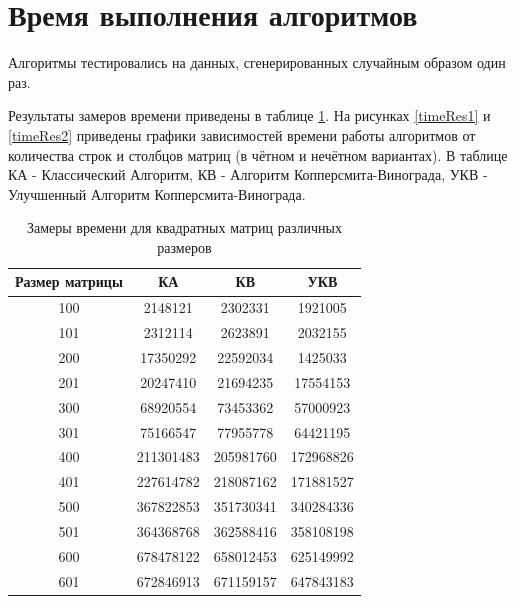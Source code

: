 \documentclass[12pt]{report}
\begin{document}
\section{Время выполнения алгоритмов}
Алгоритмы тестировались на данных, сгенерированных случайным образом один раз.

Результаты замеров времени приведены в таблице \ref{time}. На рисунках \ref{timeRes1} и \ref{timeRes2} приведены графики зависимостей времени работы алгоритмов от количества строк и столбцов матриц (в чётном и нечётном вариантах). В таблице КА - Классический Алгоритм, КВ - Алгоритм Копперсмита-Винограда, УКВ - Улучшенный Алгоритм Копперсмита-Винограда.

\newpage
\begin{table}[h]
	\begin{center}
		\caption{\label{time} Замеры времени для квадратных матриц различных размеров}
		\begin{tabular}{|c c c c|} 
 			\hline
			Размер матрицы & КА & КВ & УКВ \\ [0.5ex] 
 			\hline\hline
 			100 & 2148121& 2302331& 1921005\\
 			\hline
 			101 & 2312114& 2623891& 2032155\\
 			\hline
			200 & 17350292& 22592034& 1425033\\
			\hline
			201 & 20247410& 21694235& 17554153\\
			\hline
			300 & 68920554&  73453362& 57000923\\
			\hline
			301 &  75166547&  77955778& 64421195\\
			\hline
			400 &  211301483&  205981760& 172968826\\
			\hline
			401 &  227614782&  218087162& 171881527\\
			\hline
			500 &  367822853&  351730341& 340284336\\
			\hline
			501 &  364368768&  362588416& 358108198\\
			\hline
			600 &  678478122&  	658012453& 625149992\\
			\hline
			601 &  672846913&  671159157& 647843183\\
			\hline
			\end{tabular}
	\end{center}
\end{table}
\end{document}

